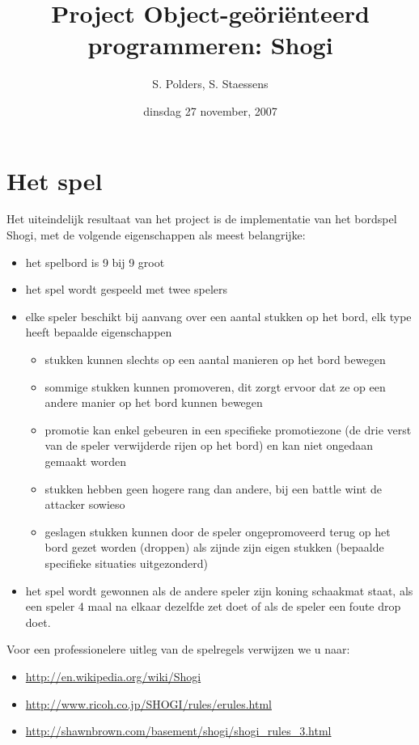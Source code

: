 \documentclass[a4paper,11pt,oneside, titlepage]{article}
\author{S. Polders, S. Staessens}
\title{Project Object-ge\"ori\"enteerd programmeren: \newline Shogi}
\date{dinsdag 27 november, 2007}
\begin{document}
\maketitle\newpage
\section{Het spel}
Het uiteindelijk resultaat van het project is de implementatie van het bordspel Shogi, met de volgende eigenschappen als meest belangrijke:
\begin{itemize}
 \item het spelbord is 9 bij 9 groot
 \item het spel wordt gespeeld met twee spelers
 \item elke speler beschikt bij aanvang over een aantal stukken op het bord, elk type heeft bepaalde eigenschappen
	\begin{itemize}
		\item stukken kunnen slechts op een aantal manieren op het bord bewegen
		\item sommige stukken kunnen promoveren, dit zorgt ervoor dat ze op een andere manier op het bord kunnen bewegen
		\item promotie kan enkel gebeuren in een specifieke promotiezone (de drie verst van de speler verwijderde rijen op het bord) en kan niet ongedaan gemaakt worden
		\item stukken hebben geen hogere rang dan andere, bij een battle wint de attacker sowieso
		\item geslagen stukken kunnen door de speler ongepromoveerd terug op het bord gezet worden (droppen) als zijnde zijn eigen stukken (bepaalde specifieke situaties uitgezonderd)
 	\end{itemize} 
 \item het spel wordt gewonnen als de andere speler zijn koning schaakmat staat, als een speler 4 maal na elkaar dezelfde zet doet of als
de speler een foute drop doet.
 \end{itemize} 
Voor een professionelere uitleg van de spelregels verwijzen we u naar: 
	\begin{itemize}
		\item \url{http://en.wikipedia.org/wiki/Shogi}
		\item \url{http://www.ricoh.co.jp/SHOGI/rules/erules.html}
		\item \url{http://shawnbrown.com/basement/shogi/shogi_rules_3.html}
 	\end{itemize}
\newpage
\end{document}
